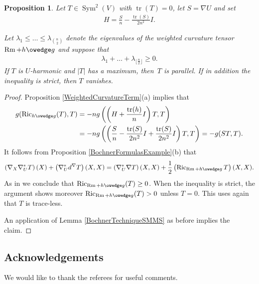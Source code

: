 \documentclass[10pt,a4paper]{amsart}
\numberwithin{equation}{section}
\newtheorem{Proposition}[Theorem]{Proposition}
{ \theoremstyle{definition}
\newtheorem{Remark}[Theorem]{Remark} }
\newcommand{\Ric} {\operatorname{Ric}}
\newcommand{ \tr } {\operatorname{tr}}
\newcommand{\Rm} {\operatorname{Rm}}
\newcommand{ \Sym } {\operatorname{Sym}}
\newcommand{ \floor }[1]{ \lfloor #1 \rfloor }
\begin{document}
\begin{Proposition}Let $T \in \Sym^2(V)$ with $\tr(T)=0$, let $S= \nabla U$ and set
\begin{gather*}
H=\frac{S}{n} - \frac{\tr(S)}{2n^2} I.
\end{gather*}

Let $\lambda_1 \leq \dots \leq \lambda_{\genfrac(){0pt}{2}{n}{2}}$ denote the eigenvalues of the weighted curvature tensor $\Rm + h \owedge g$ and suppose that
\begin{gather*}
\lambda_{1} + \dots + \lambda_{\floor{\frac{n}{2}}} \geq 0.
\end{gather*}
If $T$ is $U$-harmonic and $|T|$ has a maximum, then~$T$ is parallel. If in addition the inequality is strict, then $T$ vanishes.
\end{Proposition}
\begin{proof}Proposition \ref{WeightedCurvatureTerm}(a) implies that
\begin{align*}
g  ( \Ric_{h \owedge g}(T), T ) & = - n g \left( \left(H + \frac{\tr(h)}{n} I \right)T ,T \right) \\
&  = - n g \left( \left( \frac{S}{n} - \frac{\tr(S)}{2n^2} I + \frac{\tr(S)}{2n^2} I \right) T, T \right)
  = - g( ST,T ).
\end{align*}
It follows from Proposition \ref{BochnerFormulasExample}(b) that
\begin{gather*}
\left( \nabla_X \nabla^{*}_U T \right)(X) + \left( \nabla^{*}_U d^{\nabla} T \right) (X,X) = \left( \nabla^{*}_U \nabla T \right)(X,X)+ \frac{1}{2} \left( \Ric_{\Rm+h \owedge g} T \right) (X,X).
\end{gather*}
As in \cite[Lemma 2.1 and Proposition~2.9]{PetersenWinkBochner} we conclude that $\Ric_{\Rm + h \owedge g}(T) \geq 0$. When the inequality is strict, the argument shows moreover $\Ric_{\Rm + h \owedge g}(T) > 0$ unless $T = 0$. This uses again that $T$ is trace-less.

An application of Lemma \ref{BochnerTechniqueSMMS} as before implies the claim.
\end{proof}

\subsection*{Acknowledgements}

We would like to thank the referees for useful comments.


\end{document}
